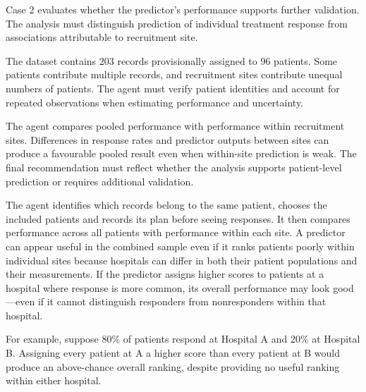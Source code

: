 Case 2 evaluates whether the predictor's performance supports further validation. The analysis must distinguish prediction of individual treatment response from associations attributable to recruitment site.

The dataset contains 203 records provisionally assigned to 96 patients. Some patients contribute multiple records, and recruitment sites contribute unequal numbers of patients. The agent must verify patient identities and account for repeated observations when estimating performance and uncertainty.

The agent compares pooled performance with performance within recruitment sites. Differences in response rates and predictor outputs between sites can produce a favourable pooled result even when within-site prediction is weak. The final recommendation must reflect whether the analysis supports patient-level prediction or requires additional validation.

The agent identifies which records belong to the same patient, chooses the included patients and records its plan before seeing responses. It then compares performance across all patients with performance within each site. A predictor can appear useful in the combined sample even if it ranks patients poorly within individual sites because hospitals can differ in both their patient populations and their measurements. If the predictor assigns higher scores to patients at a hospital where response is more common, its overall performance may look good---even if it cannot distinguish responders from nonresponders within that hospital.

For example, suppose 80\% of patients respond at Hospital A and 20\% at Hospital B. Assigning every patient at A a higher score than every patient at B would produce an above-chance overall ranking, despite providing no useful ranking within either hospital.

